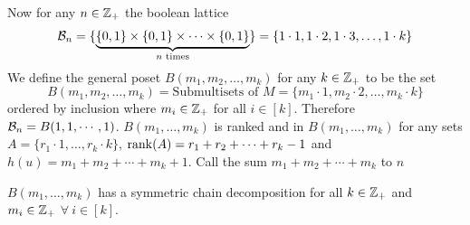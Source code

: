 Now for any $n\in\mathbb{Z}_+$ the boolean lattice $$\mathcal{B}_n=\{\underbrace{\{0,1\}\times\{0,1\}\times\cdots \times \{0,1\}}_{n\text{ times}}\}=\{1\cdot1,1\cdot 2,1\cdot 3,\dots, 1\cdot k\}$$We define the general poset $B(m_1,m_2,\dots, m_k)$ for any $k\in\mathbb{Z}_+$  to be the set $$B(m_1,m_2,\dots, m_k)=\text{Submultisets of }M=\{m_1\cdot 1,m_2\cdot2,\dots, m_k\cdot k\}$$ordered by inclusion where $m_i\in\mathbb{Z}_+$ for all $i\in[k]$. Therefore $\mathcal{B}_n=B({1,1,\cdots, 1})$. $B(m_1,\dots, m_k)$ is ranked and in $B(m_1,\dots, m_k)$ for any sets $A=\{r_1\cdot1,\dots, r_k\cdot k\}$, $\operatorname{rank}(A)=r_1+r_2+\cdots+r_k-1$ and $h(u)=m_1+m_2+\cdots+m_k+1$. Call  the sum $m_1+m_2+\cdots+m_k$ to $n$
\begin{Theorem}{}{}
	$B(m_1,\dots, m_k)$ has a symmetric chain decomposition for all $k\in\mathbb{Z}_+$ and $m_i\in \mathbb{Z}_+$ $\forall\ i\in[k]$. 
\end{Theorem}
